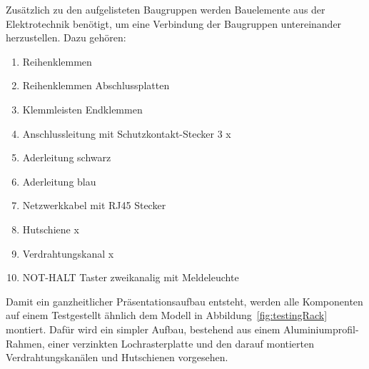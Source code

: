 Zusätzlich zu den aufgelisteten Baugruppen werden Bauelemente aus der Elektrotechnik benötigt, um eine Verbindung der Baugruppen untereinander herzustellen. Dazu gehören:

\begin{enumerate}
    \itemsep 0.05em
    \item Reihenklemmen
    \item Reihenklemmen Abschlussplatten
    \item Klemmleisten Endklemmen
    \item Anschlussleitung mit Schutzkontakt-Stecker 3 x 
    \item Aderleitung schwarz 
    \item Aderleitung blau 
    \item Netzwerkkabel mit RJ45 Stecker 
    \item {} Hutschiene  x 
    \item {} Verdrahtungskanal  x 
    \item NOT-HALT Taster zweikanalig mit Meldeleuchte
\end{enumerate}


Damit ein ganzheitlicher Präsentationsaufbau entsteht, werden alle Komponenten auf einem Testgestellt ähnlich dem Modell in Abbildung~\ref{fig:testingRack} montiert. Dafür wird ein simpler Aufbau, bestehend aus einem Aluminiumprofil-Rahmen, einer verzinkten Lochrasterplatte und den darauf montierten Verdrahtungskanälen und Hutschienen vorgesehen. 




